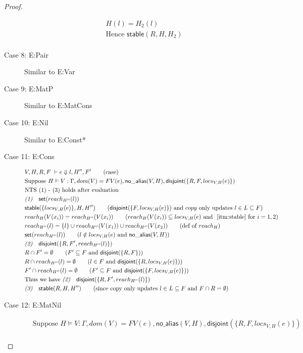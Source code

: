 \documentclass[11pt]{article}
\newcommand{\ms}[1]{\ensuremath{\mathsf{#1}}}
\newcommand{\na}[1]{\mathsf{no\_alias}(#1)}
\newcommand{\stable}[1]{\mathsf{stable}(#1)}
\newcommand{\set}[1]{\mathsf{set}(#1)}
\newcommand{\dist}[1]{\mathsf{disjoint}(#1)}
\theoremstyle{definition}
\begin{document}
\begin{proof}
\begin{description}
\begin{align*}
  &H(l) = H_2(l)\\
  &\text{Hence } \stable{R,H,H_2}\\
  \end{align*}
  \item[Case 8: E:Pair]
  Similar to E:Var
  \item[Case 9: E:MatP]
  Similar to E:MatCons
  \item[Case 10: E:Nil]
  Similar to E:Const*
  \item[Case 11: E:Cons]
  \begin{align*}
  &V,H,R,F \; \vdash e \Downarrow l,H'',F' \tag{case}\\
  &\text{Suppose } H \vDash V : \Gamma, dom(V) = FV(e), \na{V,H}, \dist{\{R,F,locs_{V,H}(e)\}}\\
  &\text{NTS (1) - (3) holds after evaluation }\\
  &\emph{(1)} \quad \ms{set}(reach_{H''}(l))\\
  &\stable{\{locs_{V,H}(e)\},H,H''} \tag{$\dist{\{F,locs_{V,H}(e)\}}$ and $copy$ only updates $l \in L \subseteq F$}\\
  &reach_H(V(x_i)) = reach_{H''}(V(x_i)) \tag{$reach_H(V(x_i)) \subseteq locs_{V,H}(e)$ and $~\ref{itm:stable}$ for $i = 1,2$}\\
  &reach_{H''}(l) = \{l\} \cup reach_{H''}(V(x_1))\cup reach_{H''}(V(x_2)) \tag{def of $reach_H$}\\
  &\set{reach_{H''}(l)} \tag{$l \notin locs_{V,H}(e)$ and $\na{V,H}$}\\ 
  &\emph{(2)} \quad \dist{\{R,F',reach_{H''}(l)\}}\\
  &R \cap F' = \emptyset \tag{$F' \subseteq F$ and $\dist{\{R,F\}}$}\\
  &R \cap reach_{H''}(l) = \emptyset \tag{$l \in F$ and $\dist{\{R,locs_{V,H}(e)\}}$}\\
  &F' \cap reach_{H''}(l) = \emptyset\tag{$F' \subseteq F$ and $\dist{\{F,locs_{V,H}(e)\}}$}\\
  &\text{Thus we have }\emph{(2)} \quad \dist{\{R,F',reach_{H''}(l)\}}\\
  &\emph{(3)} \quad \stable{R,H,H''} \tag{since copy only updates $l \in L \subseteq F$ and $F \cap R = \emptyset$}\\
  \end{align*}
  \item[Case 12: E:MatNil]
  \begin{align*}
  &\text{Suppose } H \vDash V : \Gamma, dom(V) = FV(e), \na{V,H}, \dist{\{R,F,locs_{V,H}(e)\}}\\

\end{align*}
\end{description}
\end{proof}
\end{document}
